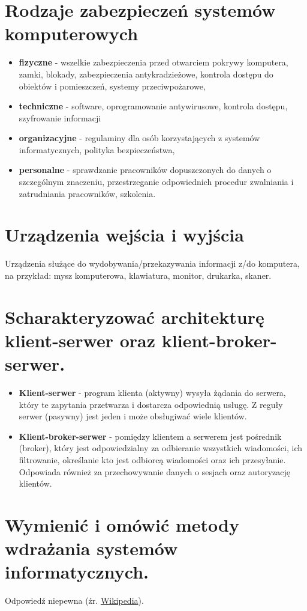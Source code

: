\documentclass[12pt,a4paper]{article}
\begin{document}
	\section{Rodzaje zabezpieczeń systemów komputerowych}
	\begin{itemize}
		\item \textbf{fizyczne} - wszelkie zabezpieczenia przed otwarciem pokrywy komputera, zamki, blokady, zabezpieczenia antykradzieżowe, kontrola dostępu do obiektów i pomieszczeń, systemy przeciwpożarowe,
		\item \textbf{techniczne} - software, oprogramowanie antywirusowe, kontrola dostępu, szyfrowanie informacji
		\item \textbf{organizacyjne} - regulaminy dla osób korzystających z systemów informatycznych, polityka bezpieczeństwa,
		\item \textbf{personalne} - sprawdzanie pracowników dopuszczonych do danych o szczególnym znaczeniu, przestrzeganie odpowiednich procedur zwalniania i zatrudniania pracowników, szkolenia.
	\end{itemize}

	\section{Urządzenia wejścia i wyjścia}
	Urządzenia służące do wydobywania/przekazywania informacji z/do komputera, na przykład: mysz komputerowa, klawiatura, monitor, drukarka, skaner.

	\section{Scharakteryzować architekturę klient-serwer oraz klient-broker-serwer.}
	\begin{itemize}
		\item  \textbf{Klient-serwer} - program klienta (aktywny) wysyła żądania do serwera, który te zapytania przetwarza i dostarcza odpowiednią usługę. Z reguły serwer (pasywny) jest jeden i może obsługiwać wiele klientów.
		\item \textbf{Klient-broker-serwer} - pomiędzy klientem a serwerem jest pośrednik (broker), który jest odpowiedzialny za odbieranie wszystkich wiadomości, ich filtrowanie, określanie kto jest odbiorcą wiadomości oraz ich przesyłanie. Odpowiada również za przechowywanie danych o sesjach oraz autoryzację klientów.
	\end{itemize}

	\section{Wymienić i omówić metody wdrażania systemów informatycznych.}
	Odpowiedź niepewna (źr. \href{https://pl.wikipedia.org/wiki/Wdro\%C5\%BCenie_systemu}{Wikipedia}).
\end{document}
